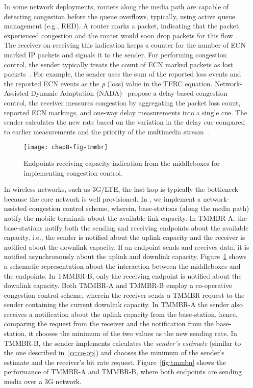 
In some network deployments, routers along the media path are capable of
detecting congestion before the queue overflows, typically, using active queue
management (e.g., RED). A router marks a packet, indicating that the packet
experienced congestion and the router would soon drop packets for this
flow~\cite{rfc3168}. The receiver on receiving this indication keeps a counter
for the number of ECN marked IP packets and signals it to the sender. For
performing congestion control, the sender typically treats the count of ECN
marked packets as lost packets~\cite{rfc6679}. For example, the sender uses
the sum of the reported loss events and the reported ECN events as the
\emph{p} (loss) value in the TFRC equation. Network-Assisted Dynamic
Adaptation (NADA)~\cite{rmcat-nada} propose a delay-based congestion control,
the receiver measures congestion by aggregating the packet loss count,
reported ECN markings, and one-way delay measurements into a single cue. The
sender calculates the new rate based on the variation in the delay cue
compared to earlier measurements and the priority of the multimedia
stream~\cite{pv-nada}.

\begin{figure}
\texttt{[image: chap8-fig-tmmbr]}
  \caption{Endpoints receiving capacity indication from the middleboxes for
  implementing congestion control.}
\label{fig:cc:tmmbrab}
\end{figure}

In wireless networks, such as 3G/LTE, the last hop is typically the bottleneck
because the core network is well provisioned. In , we
implement a network-assisted congestion control scheme, wherein, base-stations
(along the media path) notify the mobile terminals about the available link
capacity. In TMMBR-A, the base-stations notify both the sending and receiving
endpoints about the available capacity, i.e., the sender is notified about the
uplink capacity and the receiver is notified about the downlink capacity. If
an endpoint sends and receives data, it is notified asynchronously about the
uplink and downlink capacity. Figure~\ref{fig:cc:tmmbrab} shows a schematic
representation about the interaction between the middleboxes and the
endpoints. In TMMBR-B, only the receiving endpoint is notified about the
downlink capacity. Both TMMBR-A and TMMBR-B employ a co-operative congestion
control scheme, wherein the receiver sends a TMMBR request to the sender
containing the current downlink capacity. In TMMBR-A the sender also receives
a notification about the uplink capacity from the base-station, hence,
comparing the request from the receiver and the notification from the
base-station, it chooses the minimum of the two values as the new sending
rate. In TMMBR-B, the sender implements calculates the \emph{sender's
estimate} (similar to the one described in~\ref{cc:co-op}) and chooses the
minimum of the sender's estimate and the receiver's bit rate request.
Figure~\ref{fig:tmmbn} shows the performance of TMMBR-A and TMMBR-B, where
both endpoints are sending media over a 3G network.

